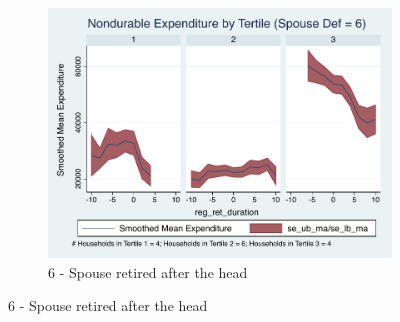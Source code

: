 \documentclass[11pt,onecolumn]{article}
\numberwithin{figure}{section}
\begin{document}
\begin{figure}
\begin{subfigure}{1.0\textwidth}
	\caption{6 - Spouse retired after the head}
	\centering
	\includegraphics[width=0.8\linewidth]{../ConsumptionPostRetirement_by_SpouseDef/Smoothed/spouse_def_6.pdf}
	\end{subfigure}
	\vspace{1cm}
	

\end{figure}
\end{document}
